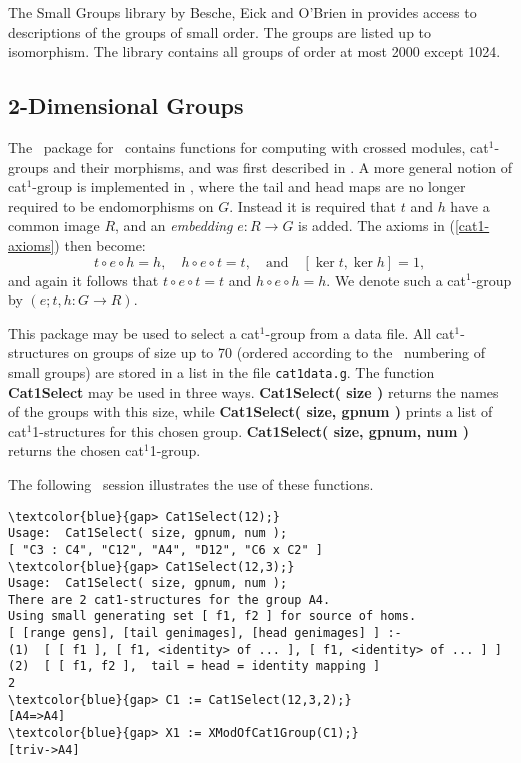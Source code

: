 \documentclass[a4paper,11pt]{article}
\theoremstyle{plain}
\theoremstyle{definition}
\begin{document}
The Small Groups library by Besche, Eick and O'Brien in \cite{besche-eick-obrien} 
provides access to descriptions of the groups of small order. 
The groups are listed up to isomorphism. 
The library contains all groups of order at most 2000 except 1024.


\subsection{2-Dimensional Groups}

The \XMod\ package for \GAP\ contains functions for computing with 
crossed modules, cat$^{1}$-groups and their morphisms, 
and was first described in \cite{xmod}. 
A more general notion of cat$^1$-group is implemented in \XMod, 
where the tail and head maps are no longer required to be endomorphisms on $G$. 
Instead it is required that $t$ and $h$ have a common image $R$, 
and an \emph{embedding} $e : R \to G$ is added.  
The axioms in (\ref{cat1-axioms}) then become:  
\[ 
t \circ e \circ h = h, \quad  
h \circ e \circ t = t, 
\quad \mbox{and}\quad  [\ker t,\ker h] = 1, 
\] 
and again it follows that $t \circ e \circ t = t$ and $h \circ e \circ h = h$. 
We denote such a cat$^1$-group by $(e;t,h : G \to R)$. 


This package may be used to select a cat$^{1}$-group from a data file. 
All cat$^{1}$-structures on groups of size up to 70 
(ordered according to the \GAP\ numbering of small groups) 
are stored in a list in the file \texttt{cat1data.g}.
The function \textbf{Cat1Select} may be used in three ways. 
\textbf{Cat1Select( size )} returns the names of the groups with this size, 
while \textbf{Cat1Select( size, gpnum )} prints a list of cat$^1$1-structures 
for this chosen group. 
\textbf{Cat1Select( size, gpnum, num )} returns the chosen cat$^1$1-group.

The following \GAP\ session illustrates the use of these functions.

\begin{Verbatim}[frame=single, fontsize=\small, commandchars=\\\{\}]
\textcolor{blue}{gap> Cat1Select(12);}
Usage:  Cat1Select( size, gpnum, num );
[ "C3 : C4", "C12", "A4", "D12", "C6 x C2" ]
\textcolor{blue}{gap> Cat1Select(12,3);}
Usage:  Cat1Select( size, gpnum, num );
There are 2 cat1-structures for the group A4.
Using small generating set [ f1, f2 ] for source of homs.
[ [range gens], [tail genimages], [head genimages] ] :-
(1)  [ [ f1 ], [ f1, <identity> of ... ], [ f1, <identity> of ... ] ]
(2)  [ [ f1, f2 ],  tail = head = identity mapping ]
2
\textcolor{blue}{gap> C1 := Cat1Select(12,3,2);}
[A4=>A4]
\textcolor{blue}{gap> X1 := XModOfCat1Group(C1);}
[triv->A4]
\end{Verbatim}
\end{document}
